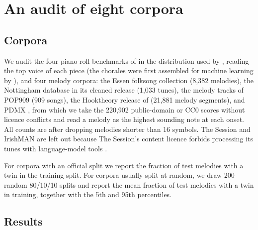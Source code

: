 \documentclass[ProofPDF]{./Styles/Jnls-Template-V3}
\begin{document}
\section{An audit of eight corpora}\label{sec:audit}

\subsection{Corpora}
We audit the four piano-roll benchmarks of \cite{boulangerlewandowski2012} in the distribution used by \cite{bai2018tcn}, reading the top voice of each piece (the chorales were first assembled for machine learning by \citealt{allan2005harmonising}), and four melody corpora: the Essen folksong collection \citep{schaffrath1995essen} (8,382 melodies), the Nottingham database in its cleaned release \citep{jukedeck2017nottingham} (1,033 tunes), the melody tracks of POP909 \citep{wang2020pop909} (909 songs), the Hooktheory release of \cite{donahue2022sheetsage} (21,881 melody segments), and PDMX \citep{long2025pdmx}, from which we take the 220,902 public-domain or CC0 scores without licence conflicts and read a melody as the highest sounding note at each onset. All counts are after dropping melodies shorter than 16 symbols. The Session and IrishMAN are left out because The Session's content licence forbids processing its tunes with language-model tools \citep{thesession2026data}.

For corpora with an official split we report the fraction of test melodies with a twin in the training split. For corpora usually split at random, we draw 200 random 80/10/10 splits and report the mean fraction of test melodies with a twin in training, together with the 5th and 95th percentiles.

\subsection{Results}
\end{document}
